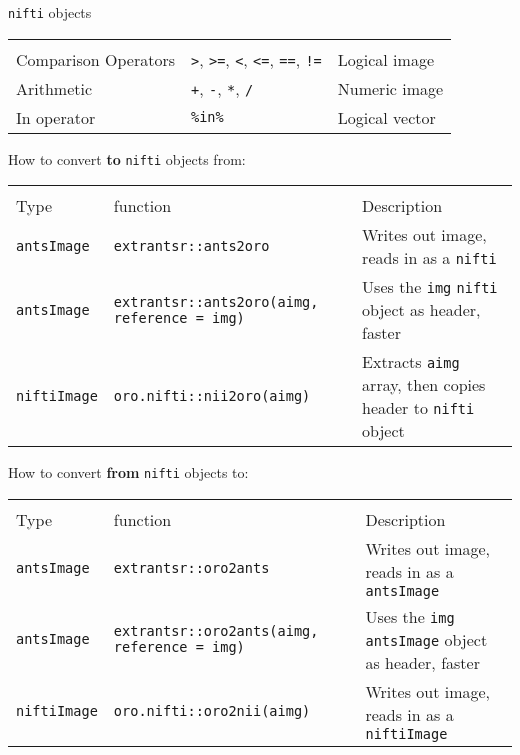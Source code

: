 \documentclass[landscape,a0paper,fontscale=0.285]{baposter} %
\newcommand{\code}[1]{\texttt{#1}}
\begin{document}
\begin{poster}
{%
\colorbox[HTML]{CCFFFF}{} \linebreak \linebreak
\code{nifti} objects\\
\begin{tabular}{m{4cm} m{3cm} l}
\textbf{}\\
Comparison Operators & \code{>}, \code{>=}, \code{<}, \code{<=}, \code{==}, \code{!=} & Logical image \\
Arithmetic & \code{+}, \code{-}, \code{*}, \code{/} & Numeric image \\
In operator & \code{\%in\%} & Logical vector 
\end{tabular}

\colorbox[HTML]{CCFFFF}{} \linebreak \linebreak
How to convert {\bf to} \code{nifti} objects from:\\
\begin{tabular}{m{3cm} m{5cm} m{7cm}}
\textbf{}\\
Type & function & Description \\
\code{antsImage} & \code{extrantsr::ants2oro} & Writes out image, reads in as a \code{nifti} \\
\code{antsImage} & \code{extrantsr::ants2oro(aimg, reference = img)} & Uses the \code{img} \code{nifti} object as header, faster \\
\code{niftiImage} & \code{oro.nifti::nii2oro(aimg)} & Extracts \code{aimg} array, then copies header to \code{nifti} object 
\end{tabular}

\dotfill \newline

How to convert {\bf from} \code{nifti} objects to: \\
\begin{tabular}{m{3cm} m{5cm} m{7cm}}
\textbf{}\\
Type & function & Description \\
\code{antsImage} & \code{extrantsr::oro2ants} & Writes out image, reads in as a \code{antsImage} \\
\code{antsImage} & \code{extrantsr::oro2ants(aimg, reference = img)} & Uses the \code{img} \code{antsImage} object as header, faster \\
\code{niftiImage} & \code{oro.nifti::oro2nii(aimg)} & Writes out image, reads in as a \code{niftiImage}
\end{tabular}

}
\end{poster}
\end{document}
